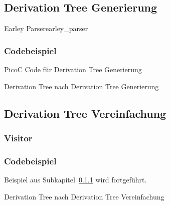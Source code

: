 
\subsection{Derivation Tree Generierung}

\begin{Definition}{Earley Parser}{earley_parser}

\end{Definition}

\subsubsection{Codebeispiel}
\label{sec:derivation_tree_generierung}

\begin{code}
  \centering
  \caption{PicoC Code für Derivation Tree Generierung}
  \label{code:picoc_code_für_derivation_tree_generierung}
\end{code}

\begin{code}
  \centering
  \caption{Derivation Tree nach Derivation Tree Generierung}
  \label{code:derivation_tree_nach_derivation_tree_generierung}
\end{code}

\subsection{Derivation Tree Vereinfachung}
\subsubsection{Visitor}
\subsubsection{Codebeispiel}

Beispiel aus Subkapitel~\ref{sec:derivation_tree_generierung} wird fortgeführt.

\begin{code}
  \centering
  \caption{Derivation Tree nach Derivation Tree Vereinfachung}
  \label{code:picoc_code_nach_derivation_tree_vereinfachung}
\end{code}

